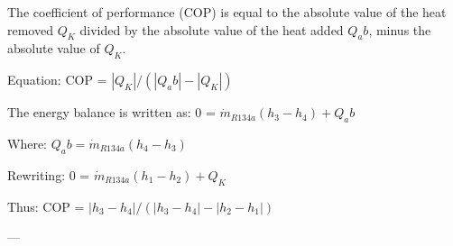 The coefficient of performance (COP) is equal to the absolute value of the heat removed \( Q_K \) divided by the absolute value of the heat added \( Q_ab \), minus the absolute value of \( Q_K \).  

Equation:  
COP = \( |Q_K| / (|Q_ab| - |Q_K|) \)  

The energy balance is written as:  
0 = \( \dot{m}_{R134a} (h_3 - h_4) + Q_ab \)  

Where:  
\( Q_ab = \dot{m}_{R134a} (h_4 - h_3) \)  

Rewriting:  
0 = \( \dot{m}_{R134a} (h_1 - h_2) + Q_K \)  

Thus:  
COP = \( |h_3 - h_4| / (|h_3 - h_4| - |h_2 - h_1|) \)  

---